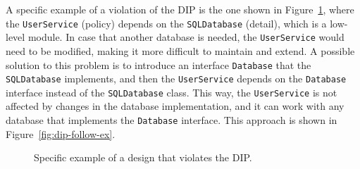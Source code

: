 A specific example of a violation of the DIP is the one shown in Figure~\ref{fig:dip-violation-ex}, where the \texttt{UserService} (policy) depends on the \texttt{SQLDatabase} (detail), which is a low-level module. In case that another database is needed, the \texttt{UserService} would need to be modified, making it more difficult to maintain and extend. A possible solution to this problem is to introduce an interface \texttt{Database} that the \texttt{SQLDatabase} implements, and then the \texttt{UserService} depends on the \texttt{Database} interface instead of the \texttt{SQLDatabase} class. This way, the \texttt{UserService} is not affected by changes in the database implementation, and it can work with any database that implements the \texttt{Database} interface. This approach is shown in Figure~\ref{fig:dip-follow-ex}.
\begin{figure}
    \centering
    \caption{Specific example of a design that violates the DIP.}
    \label{fig:dip-violation-ex}
\end{figure}
